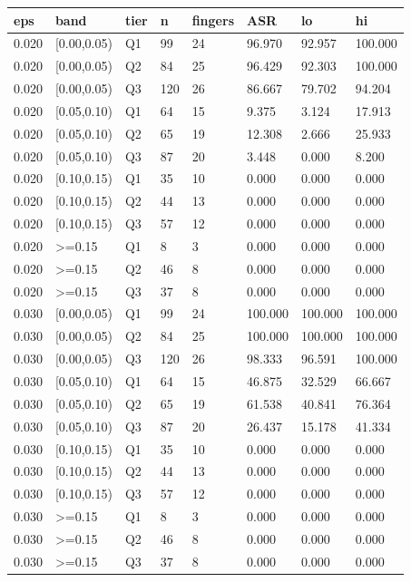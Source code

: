 \begin{tabular}{llllllll}
\hline
eps & band & tier & n & fingers & ASR & lo & hi \\
\hline
0.020 & [0.00,0.05) & Q1 & 99 & 24 & 96.970 & 92.957 & 100.000 \\
0.020 & [0.00,0.05) & Q2 & 84 & 25 & 96.429 & 92.303 & 100.000 \\
0.020 & [0.00,0.05) & Q3 & 120 & 26 & 86.667 & 79.702 & 94.204 \\
0.020 & [0.05,0.10) & Q1 & 64 & 15 & 9.375 & 3.124 & 17.913 \\
0.020 & [0.05,0.10) & Q2 & 65 & 19 & 12.308 & 2.666 & 25.933 \\
0.020 & [0.05,0.10) & Q3 & 87 & 20 & 3.448 & 0.000 & 8.200 \\
0.020 & [0.10,0.15) & Q1 & 35 & 10 & 0.000 & 0.000 & 0.000 \\
0.020 & [0.10,0.15) & Q2 & 44 & 13 & 0.000 & 0.000 & 0.000 \\
0.020 & [0.10,0.15) & Q3 & 57 & 12 & 0.000 & 0.000 & 0.000 \\
0.020 & >=0.15 & Q1 & 8 & 3 & 0.000 & 0.000 & 0.000 \\
0.020 & >=0.15 & Q2 & 46 & 8 & 0.000 & 0.000 & 0.000 \\
0.020 & >=0.15 & Q3 & 37 & 8 & 0.000 & 0.000 & 0.000 \\
0.030 & [0.00,0.05) & Q1 & 99 & 24 & 100.000 & 100.000 & 100.000 \\
0.030 & [0.00,0.05) & Q2 & 84 & 25 & 100.000 & 100.000 & 100.000 \\
0.030 & [0.00,0.05) & Q3 & 120 & 26 & 98.333 & 96.591 & 100.000 \\
0.030 & [0.05,0.10) & Q1 & 64 & 15 & 46.875 & 32.529 & 66.667 \\
0.030 & [0.05,0.10) & Q2 & 65 & 19 & 61.538 & 40.841 & 76.364 \\
0.030 & [0.05,0.10) & Q3 & 87 & 20 & 26.437 & 15.178 & 41.334 \\
0.030 & [0.10,0.15) & Q1 & 35 & 10 & 0.000 & 0.000 & 0.000 \\
0.030 & [0.10,0.15) & Q2 & 44 & 13 & 0.000 & 0.000 & 0.000 \\
0.030 & [0.10,0.15) & Q3 & 57 & 12 & 0.000 & 0.000 & 0.000 \\
0.030 & >=0.15 & Q1 & 8 & 3 & 0.000 & 0.000 & 0.000 \\
0.030 & >=0.15 & Q2 & 46 & 8 & 0.000 & 0.000 & 0.000 \\
0.030 & >=0.15 & Q3 & 37 & 8 & 0.000 & 0.000 & 0.000 \\

\end{tabular}
